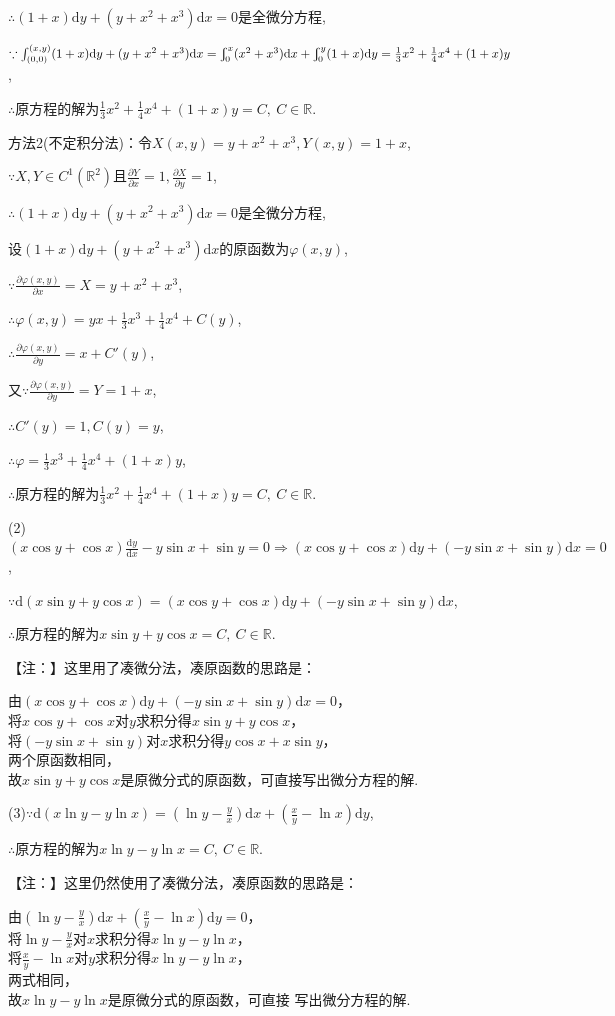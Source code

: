 \documentclass[12pt,UTF8,fleqn]{ctexart}
\newcommand{\Int}[4]{\varint\nolimits_{#1}^{#2}#3\mathrm d#4}
\newcommand{\md}[1]{\mathrm d#1}
\newcommand{\ppx}[1]{\frac{\partial #1}{\partial x}}
\newcommand{\ppy}[1]{\frac{\partial #1}{\partial y}}
\begin{document}
\begin{enumerate}
$\therefore(1+x)\md y+(y+x^2+x^3)\md x=0$是全微分方程,

$\because\int_{(0,0)}^{(x,y)}(1+x)\md y+(y+x^2+x^3)\md x=\Int0x{(x^2+x^3)}x+\Int0y{(1+x)}y=\frac13x^2+\frac14x^4+(1+x)y$,

$\therefore$原方程的解为$\frac13x^2+\frac14x^4+(1+x)y=C,\ C\in\mathbb R$.

方法2(不定积分法)：令$X(x,y)=y+x^2+x^3,Y(x,y)=1+x$,

$\because X,Y\in C^1(\mathbb R^2)$且$\ppx{Y}=1,\ppy{X}=1$,

$\therefore(1+x)\md y+(y+x^2+x^3)\md x=0$是全微分方程,

设$(1+x)\md y+(y+x^2+x^3)\md x$的原函数为$\varphi(x,y)$,

$\because\ppx{\varphi(x,y)}=X=y+x^2+x^3$,

$\therefore\varphi(x,y)=yx+\frac13x^3+\frac14x^4+C(y)$,

$\therefore\ppy{\varphi(x,y)}=x+C'(y)$,

又$\because\ppy{\varphi(x,y)}=Y=1+x$,

$\therefore C'(y)=1,C(y)=y$,

$\therefore\varphi=\frac13x^3+\frac14x^4+(1+x)y$,

$\therefore$原方程的解为$\frac13x^2+\frac14x^4+(1+x)y=C,\ C\in\mathbb R$.

(2)$(x\cos y+\cos x)\frac{\md y}{\md x}-y\sin x+\sin y=0\Rightarrow(x\cos y+\cos x)\md y+(-y\sin x+\sin y)\md x=0$,

$\because\md(x\sin y+y\cos x)=(x\cos y+\cos x)\md y+(-y\sin x+\sin y)\md x$,

$\therefore$原方程的解为$x\sin y+y\cos x=C,\ C\in\mathbb R$.

【注：】这里用了凑微分法，凑原函数的思路是：

由$(x\cos y+\cos x)\md y+(-y\sin x+\sin y)\md x=0$，\\将$x\cos y+\cos x$对$y$求积分得$x\sin y+y\cos x$，\\将$(-y\sin x+\sin y)$对$x$求积分得$y\cos x+x\sin y$，\\两个原函数相同，\\故$x\sin y+y\cos x$是原微分式的原函数，可直接写出微分方程的解.

(3)$\because\md(x\ln y-y\ln x)=(\ln y-\frac yx)\md x+(\frac xy-\ln x)\md y$,

$\therefore$原方程的解为$x\ln y-y\ln x=C,\ C\in\mathbb R$.

【注：】这里仍然使用了凑微分法，凑原函数的思路是：

由$(\ln y-\frac yx)\md x+(\frac xy-\ln x)\md y=0$，\\将$\ln y-\frac yx$对$x$求积分得$x\ln y-y\ln x$，\\将$\frac xy-\ln x$对$y$求积分得$x\ln y-y\ln x$，\\两式相同，\\故$x\ln y-y\ln x$是原微分式的原函数，可直接 写出微分方程的解.


\end{enumerate}
\end{document}
